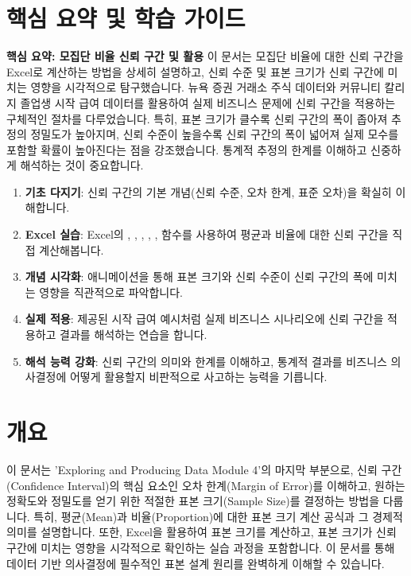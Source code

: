 \documentclass[11pt,a4paper]{article}
\theoremstyle{definition}
\begin{document}
\begin{enumerate}
\begin{enumerate}
\newpage
\section{핵심 요약 및 학습 가이드}

\begin{summarybox}
    \textbf{핵심 요약: 모집단 비율 신뢰 구간 및 활용}
    이 문서는 모집단 비율에 대한 신뢰 구간을 Excel로 계산하는 방법을 상세히 설명하고, 신뢰 수준 및 표본 크기가 신뢰 구간에 미치는 영향을 시각적으로 탐구했습니다. 뉴욕 증권 거래소 주식 데이터와 커뮤니티 칼리지 졸업생 시작 급여 데이터를 활용하여 실제 비즈니스 문제에 신뢰 구간을 적용하는 구체적인 절차를 다루었습니다. 특히, 표본 크기가 클수록 신뢰 구간의 폭이 좁아져 추정의 정밀도가 높아지며, 신뢰 수준이 높을수록 신뢰 구간의 폭이 넓어져 실제 모수를 포함할 확률이 높아진다는 점을 강조했습니다. 통계적 추정의 한계를 이해하고 신중하게 해석하는 것이 중요합니다.
\end{summarybox}

\begin{examplebox}[title=학습 로드맵: 신뢰 구간 마스터하기]
    \begin{enumerate}
        \item \textbf{기초 다지기}: 신뢰 구간의 기본 개념(신뢰 수준, 오차 한계, 표준 오차)을 확실히 이해합니다.
        \item \textbf{Excel 실습}: Excel의 , , , , ,  함수를 사용하여 평균과 비율에 대한 신뢰 구간을 직접 계산해봅니다.
        \item \textbf{개념 시각화}: 애니메이션을 통해 표본 크기와 신뢰 수준이 신뢰 구간의 폭에 미치는 영향을 직관적으로 파악합니다.
        \item \textbf{실제 적용}: 제공된 시작 급여 예시처럼 실제 비즈니스 시나리오에 신뢰 구간을 적용하고 결과를 해석하는 연습을 합니다.
        \item \textbf{해석 능력 강화}: 신뢰 구간의 의미와 한계를 이해하고, 통계적 결과를 비즈니스 의사결정에 어떻게 활용할지 비판적으로 사고하는 능력을 기릅니다.
    \end{enumerate}
\end{examplebox}

\newpage

\newpage
\section{개요}
이 문서는 'Exploring and Producing Data Module 4'의 마지막 부분으로, 신뢰 구간(Confidence Interval)의 핵심 요소인 오차 한계(Margin of Error)를 이해하고, 원하는 정확도와 정밀도를 얻기 위한 적절한 표본 크기(Sample Size)를 결정하는 방법을 다룹니다. 특히, 평균(Mean)과 비율(Proportion)에 대한 표본 크기 계산 공식과 그 경제적 의미를 설명합니다. 또한, Excel을 활용하여 표본 크기를 계산하고, 표본 크기가 신뢰 구간에 미치는 영향을 시각적으로 확인하는 실습 과정을 포함합니다. 이 문서를 통해 데이터 기반 의사결정에 필수적인 표본 설계 원리를 완벽하게 이해할 수 있습니다.


\end{enumerate}
\end{enumerate}
\end{document}
